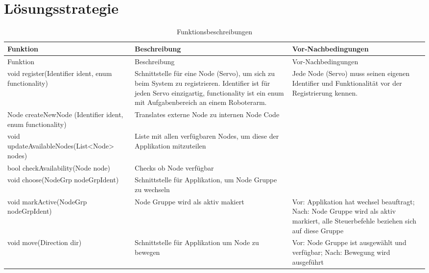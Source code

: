 \chapter{Lösungsstrategie}


\begin{longtable}{|>{\raggedright\arraybackslash}p{4cm}|>{\raggedright\arraybackslash}p{5cm}|>{\raggedright\arraybackslash}p{5cm}|}
	\caption{Funktionsbeschreibungen} \label{tab:loesungsstrategie} \\
	\hline
	Funktion & Beschreibung & Vor-Nachbedingungen \\
	\hline
	\endfirsthead
	
	\hline
	Funktion & Beschreibung & Vor-Nachbedingungen \\
	\hline
	\endhead
	
	\hline
	\endfoot
	
	
	void register(Identifier ident, enum functionality) & 
Schnittstelle für eine Node (Servo), um sich zu beim System zu registrieren. Identifier ist für jeden Servo einzigartig, functionality ist ein enum mit Aufgabenbereich an einem Roboterarm. 
	& Jede Node (Servo) muss seinen eigenen Identifier und Funktionalität vor der Registrierung kennen. 
	\\
	\hline
	Node createNewNode (Identifier ident, enum functionality)
	& Translates externe Node zu internen Node Code
	&
	\\
	\hline
	void updateAvailableNodes(List<Node> nodes)
	& Liste mit allen verfügbaren Nodes, um diese der Applikation mitzuteilen
	& 
	\\
	\hline
	bool checkAvailability(Node node)
	& Checks ob Node verfügbar	
	&
	\\
	\hline
	void choose(NodeGrp nodeGrpIdent) 
	& Schnittstelle für Applikation, um Node Gruppe zu wechseln
	&
	\\
	\hline
	void markActive(NodeGrp nodeGrpIdent)
	& Node Gruppe wird als aktiv makiert
	& Vor: Applikation hat wechsel beauftragt; Nach: Node Gruppe wird als aktiv markiert, alle Steuerbefehle beziehen sich auf diese Gruppe
	\\
	\hline
	void move(Direction dir) 
	& Schnittstelle für Applikation um Node zu bewegen 
	& Vor: Node Gruppe ist ausgewählt und verfügbar; Nach: Bewegung wird ausgeführt
	\\
	\hline
\end{longtable}


